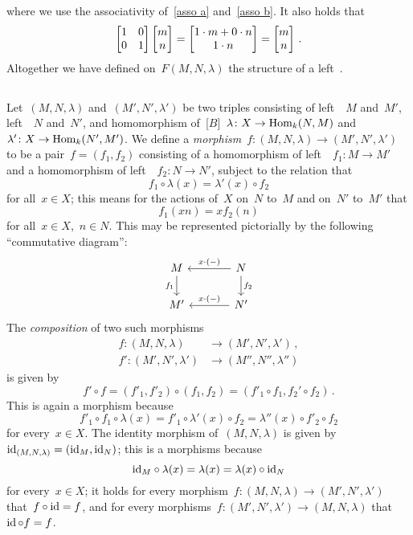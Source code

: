 where we use the associativity of~\eqref{asso a} and~\eqref{asso b}.
It also holds that
\[
  \begin{bmatrix}
    1 & 0 \\
    0 & 1
  \end{bmatrix}
  \begin{bmatrix} m \\ n \end{bmatrix}
  =
  \begin{bmatrix} 1 \cdot m + 0 \cdot n \\ 1 \cdot n \end{bmatrix}
  =
  \begin{bmatrix} m \\ n \end{bmatrix} \,.
\]
Altogether we have defined on~$F(M,N,\lambda)$ the structure of a left~{}.





\subsection{}

Let~$(M, N, \lambda)$ and~$(M', N', \lambda')$ be two triples consisting of left~{}~$M$ and~$M'$, left~{}~$N$ and~$N'$, and homomorphism of~{[$B$]}~$\lambda \colon X \to \operatorname{Hom}_k(N, M)$ and~$\lambda' \colon X \to \operatorname{Hom}_k(N', M')$.
We define a \emph{morphism}~$f \colon (M, N, \lambda) \to (M', N', \lambda')$ to be a pair~$f = (f_1, f_2)$ consisting of a homomorphism of left~{}~$f_1 \colon M \to M'$ and a homomorphism of left~{}~$f_2 \colon N \to N'$, subject to the relation that
\[
    f_1 \circ \lambda(x)
  = \lambda'(x) \circ f_2
\]
for all~$x \in X$; this means for the actions of~$X$ on~$N$ to~$M$ and on~$N'$ to~$M'$ that
\[
    f_1(xn)
  = x f_2(n)
\]
for all~$x \in X$,~$n \in N$.
This may be represented pictorially by the following \enquote{commutative diagram}:
\[
  \begin{tikzcd}[column sep = large]
      M
      \arrow{d}[left]{f_1}
    & N
      \arrow{l}[above]{x \cdot (-)}
      \arrow{d}[right]{f_2}
    \\
      M'
    & N'
      \arrow{l}[above]{x \cdot (-)}
  \end{tikzcd}
\]
The \emph{composition} of two such morphisms
\begin{align*}
  f   \colon (M, N, \lambda)    &\to  (M', N', \lambda') \,,  \\
  f'  \colon (M', N', \lambda') &\to  (M'', N'', \lambda'')
\end{align*}
is given by
\[
    f' \circ f
  = (f'_1, f'_2) \circ (f_1, f_2)
  = (f'_1 \circ f_1, f_2' \circ f_2) \,.
\]
This is again a morphism because
\[
    f'_1 \circ f_1 \circ \lambda(x)
  = f'_1 \circ \lambda'(x) \circ f_2
  = \lambda''(x) \circ f'_2 \circ f_2
\]
for every~$x \in X$.
The identity morphism of~$(M, N, \lambda)$ is given by~$\operatorname{id}_{(M,N,\lambda)} = (\operatorname{id}_M, \operatorname{id}_N)$;
this is a morphisms because
\[
    {\operatorname{id}_M} \circ \lambda(x)
  = \lambda(x)
  = \lambda(x) \circ \operatorname{id}_N
\]
for every~$x \in X$;
it holds for every morphism~$f \colon (M,N,\lambda) \to (M',N',\lambda')$ that~$f \circ \operatorname{id} = f$, and for every morphisms~$f \colon (M',N',\lambda') \to (M,N,\lambda)$ that~$\operatorname{id} \circ f = f$.


